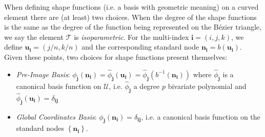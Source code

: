 \documentclass[oneside, reqno]{amsart}
\theoremstyle{definition}
\newcommand{\utri}{\mathcal{U}}
\begin{document}
When defining shape functions (i.e. a basis with geometric meaning) on a
curved element there are (at least) two choices. When the degree of the
shape functions is the same as the degree of the function being
represented on the B\'{e}zier triangle,
we say the element \(\mathcal{T}\) is \emph{isoparametric}.
For the multi-index
\(\bm{i} = (i, j , k)\), we define \(\bm{u}_{\bm{i}} =
\left(j/n, k/n\right)\) and the corresponding standard node
\(\bm{n}_{\bm{i}} = b\left(\bm{u}_{\bm{i}}\right)\).
Given these points, two choices for shape functions present
themselves:
\begin{itemize}
  \itemsep 0em
  \item \emph{Pre-Image Basis}:
    \(\phi_{\bm{j}}\left(\bm{n}_{\bm{i}}\right) =
      \widehat{\phi}_{\bm{j}}\left(\bm{u}_{\bm{i}}\right) =
      \widehat{\phi}_{\bm{j}}\left(b^{-1}\left(
      \bm{n}_{\bm{i}}\right)\right)\)
    where \(\widehat{\phi}_{\bm{j}}\) is a canonical basis function
    on \(\utri\), i.e.
    \(\widehat{\phi}_{\bm{j}}\) a degree \(p\) bivariate polynomial and
    \(\widehat{\phi}_{\bm{j}}\left(\bm{u}_{\bm{i}}\right) =
    \delta_{\bm{i} \bm{j}}\)
  \item \emph{Global Coordinates Basis}:
    \(\phi_{\bm{j}}\left(\bm{n}_{\bm{i}}\right) =
    \delta_{\bm{i} \bm{j}}\), i.e. a canonical basis function
    on the standard nodes \(\left\{\bm{n}_{\bm{i}}\right\}\).
\end{itemize}
\end{document}
